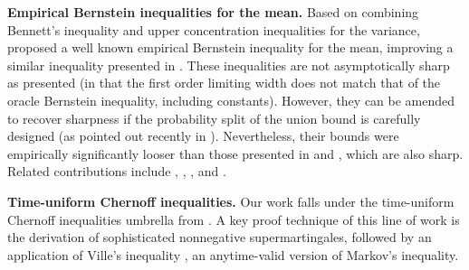  

\textbf{Empirical Bernstein inequalities for the mean.} Based on combining Bennett's inequality and upper concentration inequalities for the variance, 
\citet[Theorem 11]{maurer2009empirical} proposed a well known empirical Bernstein inequality for the mean, improving a similar inequality presented in \citet[Theorem 1]{audibert2009exploration}. These inequalities are not asymptotically sharp as presented (in that the first order limiting width does not match that of the oracle Bernstein inequality, including constants). However, they can be amended to recover sharpness if the probability split of the union bound is carefully designed (as pointed out recently in \citet[Section B.2]{wang2024sharp}). Nevertheless, their bounds were empirically significantly looser \citep[Figure 3]{waudby2024estimating} than those presented in \citet[Theorem 4]{howard2021time}  and \citet[Theorem 2]{waudby2024estimating}, which are also sharp. Related contributions include \citet[Theorem 2]{mnih2008empirical}, \citet[Corollary 4]{jang2023tighter}, \citet[Theorem 3]{orabona2023tight}, and \citet[Corollary 1]{martinez2024empirical}. 




\textbf{Time-uniform Chernoff inequalities.} Our work falls under the time-uniform Chernoff inequalities umbrella from \citet{howard2020time,howard2021time,waudby2024estimating}. A key proof technique of this line of work is the derivation of sophisticated nonnegative supermartingales, followed by an application of Ville's inequality \citep{ville1939etude}, an anytime-valid version of Markov's inequality. 


